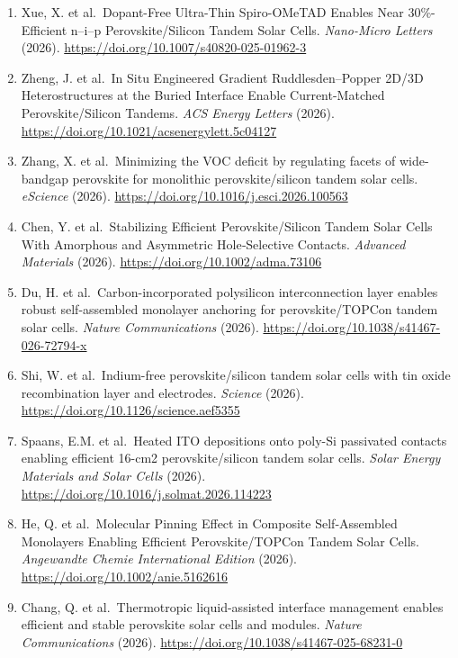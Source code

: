 \documentclass[
  11pt,
]{article}
\begin{document}
\begin{enumerate}
  \emph{Progress in Photovoltaics Research and Applications} (2026).
  \url{https://doi.org/10.1002/pip.70077}
\item
  Xue, X. et al.~Dopant-Free Ultra-Thin Spiro-OMeTAD Enables Near
  30\%-Efficient n--i--p Perovskite/Silicon Tandem Solar Cells.
  \emph{Nano-Micro Letters} (2026).
  \url{https://doi.org/10.1007/s40820-025-01962-3}
\item
  Zheng, J. et al.~In Situ Engineered Gradient Ruddlesden--Popper 2D/3D
  Heterostructures at the Buried Interface Enable Current-Matched
  Perovskite/Silicon Tandems. \emph{ACS Energy Letters} (2026).
  \url{https://doi.org/10.1021/acsenergylett.5c04127}
\item
  Zhang, X. et al.~Minimizing the VOC deficit by regulating facets of
  wide-bandgap perovskite for monolithic perovskite/silicon tandem solar
  cells. \emph{eScience} (2026).
  \url{https://doi.org/10.1016/j.esci.2026.100563}
\item
  Chen, Y. et al.~Stabilizing Efficient Perovskite/Silicon Tandem Solar
  Cells With Amorphous and Asymmetric Hole‐Selective Contacts.
  \emph{Advanced Materials} (2026).
  \url{https://doi.org/10.1002/adma.73106}
\item
  Du, H. et al.~Carbon-incorporated polysilicon interconnection layer
  enables robust self-assembled monolayer anchoring for
  perovskite/TOPCon tandem solar cells. \emph{Nature Communications}
  (2026). \url{https://doi.org/10.1038/s41467-026-72794-x}
\item
  Shi, W. et al.~Indium-free perovskite/silicon tandem solar cells with
  tin oxide recombination layer and electrodes. \emph{Science} (2026).
  \url{https://doi.org/10.1126/science.aef5355}
\item
  Spaans, E.M. et al.~Heated ITO depositions onto poly-Si passivated
  contacts enabling efficient 16-cm2 perovskite/silicon tandem solar
  cells. \emph{Solar Energy Materials and Solar Cells} (2026).
  \url{https://doi.org/10.1016/j.solmat.2026.114223}
\item
  He, Q. et al.~Molecular Pinning Effect in Composite Self‐Assembled
  Monolayers Enabling Efficient Perovskite/TOPCon Tandem Solar Cells.
  \emph{Angewandte Chemie International Edition} (2026).
  \url{https://doi.org/10.1002/anie.5162616}
\item
  Chang, Q. et al.~Thermotropic liquid-assisted interface management
  enables efficient and stable perovskite solar cells and modules.
  \emph{Nature Communications} (2026).
  \url{https://doi.org/10.1038/s41467-025-68231-0}

\end{enumerate}
\end{document}

